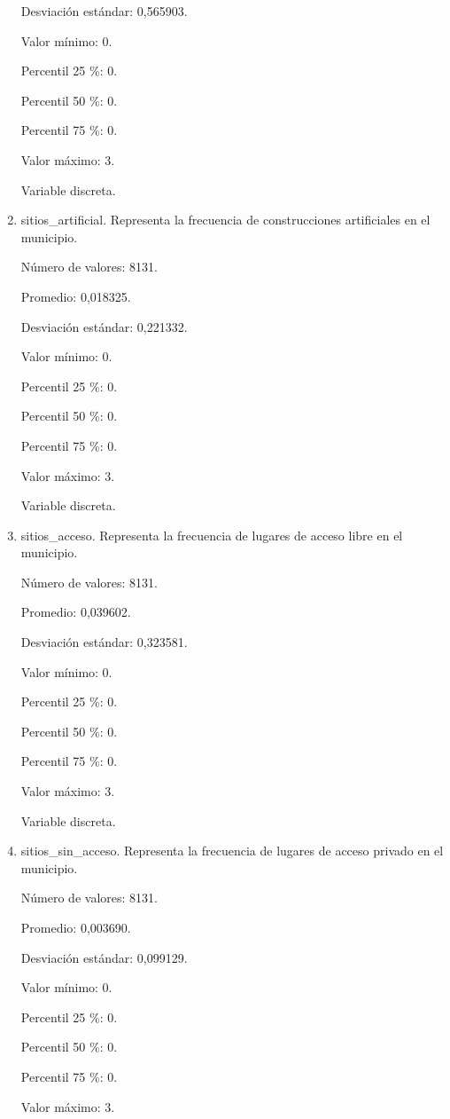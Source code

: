 \begin{enumerate}
	Desviación estándar: 0,565903.
	
	Valor mínimo: 0.
	
	Percentil 25 \%: 0.
	
	Percentil 50 \%: 0.
	
	Percentil 75 \%: 0.
	
	Valor máximo: 3.
	
	Variable discreta.

	\item sitios\_artificial. Representa la frecuencia de construcciones artificiales en el municipio.
	
	Número de valores: 8131.
	
	Promedio: 0,018325.
	
	Desviación estándar: 0,221332.
	
	Valor mínimo: 0.
	
	Percentil 25 \%: 0.
	
	Percentil 50 \%: 0.
	
	Percentil 75 \%: 0.
	
	Valor máximo: 3.
	
	Variable discreta.

	\item sitios\_acceso. Representa la frecuencia de lugares de acceso libre en el municipio.
	
	Número de valores: 8131.
	
	Promedio: 0,039602.
	
	Desviación estándar: 0,323581.
	
	Valor mínimo: 0.
	
	Percentil 25 \%: 0.
	
	Percentil 50 \%: 0.
	
	Percentil 75 \%: 0.
	
	Valor máximo: 3.
	
	Variable discreta.

	\item sitios\_sin\_acceso. Representa la frecuencia de lugares de acceso privado en el municipio.
	
	Número de valores: 8131.
	
	Promedio: 0,003690.
	
	Desviación estándar: 0,099129.
	
	Valor mínimo: 0.
	
	Percentil 25 \%: 0.
	
	Percentil 50 \%: 0.
	
	Percentil 75 \%: 0.
	
	Valor máximo: 3.
	

\end{enumerate}
